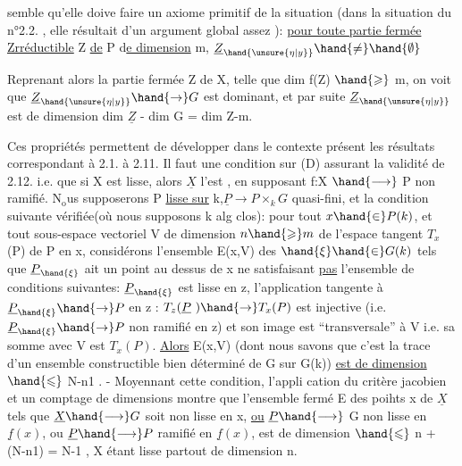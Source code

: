 semble qu'elle doive faire un axiome primitif de la situation (dans la
situation du n°2.2. , elle résultait d'un argument global assez  ):
\uline{pour toute partie fermée Zrréductible} Z \uline{de} P d\uline{e dimension} m, $\underline{Z}_{\hand{\unsure{\eta|y}}} \hand{\neq} \hand{\emptyset}$ 


 Reprenant alors la
partie fermée Z de X, telle que dim f(Z) $\hand{\geqslant}$ m, on voit que $\underline{Z}_{\hand{\unsure{\eta|y}}} \hand{\rightarrow} G$ est
dominant, et par suite $\underline{Z}_{\hand{\unsure{\eta|y}}}$ est de dimension dim $\underline{Z}$ - dim G = dim Z-m.

Ces propriétés permettent de développer dans le contexte présent
les résultats correspondant à 2.1. à 2.11. Il faut une condition sur (D)
assurant la validité de 2.12. i.e. que si X est lisse, alors $\underline{X}$ l'est
, en supposant f:X $\hand{\longrightarrow}$ P non ramifié. N$_{\mathrm{o}}$us supposerons
 P \uline{lisse sur} k,$\underline{P} \rightarrow P \times_k G$ quasi-fini, et la condition suivante vérifiée(où nous supposons k alg clos): pour
tout $x \hand{\in} P(k)$, et tout sous-espace vectoriel V de dimension $n \hand{\geqslant} m$ de l'espace tangent
$T_x$(P) de P en x, considérons l'ensemble E(x,V)  des $\hand{\xi} \hand{\in} G(k)$ tels que
$\underline{P}_{\hand{\xi}}$ ait un point  au dessus de x 
ne satisfaisant \uline{pas} l'ensemble de conditions suivantes: $\underline{P}_{\hand{\xi}}$ est lisse en
z, 
l'application tangente à $\underline{P}_{\hand{\xi}} \hand{\rightarrow} P$ en z : $T_z(\underline{P}\ ) \hand{\rightarrow} T_x(P)$ est injective
(i.e. $\underline{P}_{\hand{\xi}} \hand{\rightarrow} P$ non ramifié en z) et son image est ``transversale'' à V
i.e. sa somme avec V est $T_x(P)$. \uline{Alors} E(x,V) (dont nous savons que
c'est la trace d'un ensemble  constructible bien déterminé de G sur G(k))
\uline{est de dimension} $\hand{\leqslant}$ N-n\unsure{-|+}1 . - Moyennant cette condition,  l'appli\unsure{:|-}
cation du critère jacobien et un comptage de dimensions montre que
l'ensemble fermé E des poihts x de $\underline{X}$ tels que $\underline{X} \hand{\longrightarrow} G$ soit non lisse en x, \uline{ou}
$\underline{P} \hand{\longrightarrow}$ G non lisse en $\underline{f}(x)$, ou $\underline{P} \hand{\longrightarrow} P$ ramifié en $\underline{f}(x)$, est de
dimension $\hand{\leqslant}$ n + (N-n\unsure{-|+}1) = N-1 , \hand{(}X étant lisse partout de dimension n\hand{)}.

